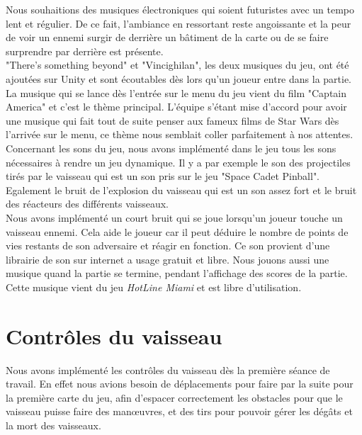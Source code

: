 \documentclass[12pt, titlepage]{article}
\begin{document}
\begin{spacing}{1.5}
Nous souhaitions des musiques électroniques qui soient futuristes avec un tempo lent et régulier. De ce fait, l'ambiance en ressortant reste angoissante et la peur de voir un ennemi surgir de derrière un bâtiment de la carte ou de se faire surprendre par derrière est présente.\\

"There's something beyond" et "Vincighilan", les deux musiques du jeu, ont été ajoutées sur Unity et sont écoutables dès lors qu'un joueur entre dans la partie. \\

La musique qui se lance dès l’entrée sur le menu du jeu vient du film "Captain America" et c’est le thème principal. L’équipe s’étant mise d’accord pour avoir une musique qui fait tout de suite penser aux fameux films de Star Wars dès l’arrivée sur le menu, ce thème nous semblait coller parfaitement à nos attentes. \\

Concernant les sons du jeu, nous avons implémenté dans le jeu tous les sons nécessaires à rendre un jeu dynamique. Il y a par exemple le son des projectiles tirés par le vaisseau qui est un son pris sur le jeu "Space Cadet Pinball". Egalement le bruit de l’explosion du vaisseau qui est un son assez fort et le bruit des réacteurs des différents vaisseaux. \\

Nous avons implémenté un court bruit qui se joue lorsqu'un joueur touche un vaisseau ennemi. Cela aide le joueur car il peut déduire le nombre de points de vies restants de son adversaire et réagir en fonction. Ce son provient d'une librairie de son sur internet a usage gratuit et libre. Nous jouons aussi une musique quand la partie se termine, pendant l'affichage des scores de la partie. Cette musique vient du jeu \textit{HotLine Miami} et est libre d'utilisation. \\


\newpage
\section{Contrôles du vaisseau}

Nous avons implémenté les contrôles du vaisseau dès la première séance de travail. En effet nous avions besoin de déplacements pour faire par la suite pour la première carte du jeu, afin d'espacer correctement les obstacles pour que le vaisseau puisse faire des man\oe uvres, et des tirs pour pouvoir gérer les dégâts et la mort des vaisseaux.\\


\end{spacing}
\end{document}

